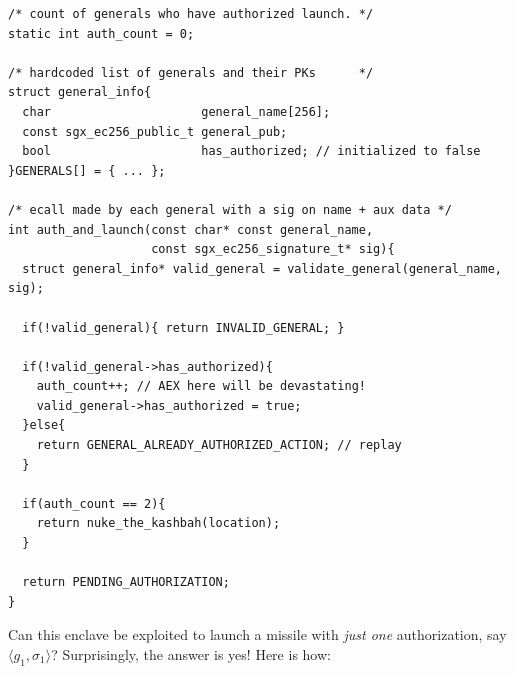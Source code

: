 \documentclass[10pt, letterpaper]{article}
\begin{document}
  \begin{center}
  \begin{lstlisting}[captionpos=b,
                     caption={An enclave suseptible to state malleability},
                     label=code:malleability]
/* count of generals who have authorized launch. */
static int auth_count = 0;

/* hardcoded list of generals and their PKs      */
struct general_info{
  char                     general_name[256];
  const sgx_ec256_public_t general_pub;
  bool                     has_authorized; // initialized to false
}GENERALS[] = { ... };

/* ecall made by each general with a sig on name + aux data */
int auth_and_launch(const char* const general_name,
                    const sgx_ec256_signature_t* sig){
  struct general_info* valid_general = validate_general(general_name, sig);

  if(!valid_general){ return INVALID_GENERAL; }

  if(!valid_general->has_authorized){
    auth_count++; // AEX here will be devastating!
    valid_general->has_authorized = true;
  }else{
    return GENERAL_ALREADY_AUTHORIZED_ACTION; // replay
  }

  if(auth_count == 2){
    return nuke_the_kashbah(location);
  }

  return PENDING_AUTHORIZATION;
}
\end{lstlisting}
\end{center}

  Can this enclave be exploited to launch a missile with \textit{just
    one} authorization, say $\langle g_1, \sigma_1 \rangle$?
  Surprisingly, the answer is yes! Here is how:
\end{document}
